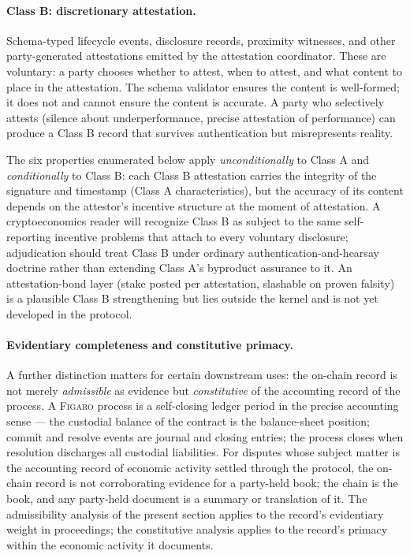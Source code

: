 \documentclass[11pt,a4paper]{article}
\theoremstyle{remark}
\newcommand{\figaro}{\textsc{Figaro}}
\begin{document}
\paragraph{Class B: discretionary attestation.}
Schema-typed lifecycle events, disclosure records, proximity
witnesses, and other party-generated attestations emitted by the
attestation coordinator. These are voluntary: a party chooses
whether to attest, when to attest, and what content to place in
the attestation. The schema validator ensures the content is
well-formed; it does not and cannot ensure the content is
accurate. A party who selectively attests (silence about
underperformance, precise attestation of performance) can produce
a Class B record that survives authentication but misrepresents
reality.

\medskip

The six properties enumerated below apply \emph{unconditionally}
to Class A and \emph{conditionally} to Class B: each Class B
attestation carries the integrity of the signature and timestamp
(Class A characteristics), but the accuracy of its content
depends on the attestor's incentive structure at the moment of
attestation. A cryptoeconomics reader will recognize Class B as
subject to the same self-reporting incentive problems that
attach to every voluntary disclosure; adjudication should treat
Class B under ordinary authentication-and-hearsay doctrine
rather than extending Class A's byproduct assurance to it. An
attestation-bond layer (stake posted per attestation, slashable
on proven falsity) is a plausible Class B strengthening but lies
outside the kernel and is not yet developed in the protocol.

\paragraph{Evidentiary completeness and constitutive primacy.}
A further distinction matters for certain downstream uses:
the on-chain record is not merely \emph{admissible} as
evidence but \emph{constitutive} of the accounting record of
the process. A \figaro{} process is a self-closing ledger period
in the precise accounting sense --- the custodial balance of the
contract is the balance-sheet position; commit and resolve
events are journal and closing entries; the process closes
when resolution discharges all custodial liabilities. For
disputes whose subject matter is the accounting record of
economic activity settled through the protocol, the on-chain
record is not corroborating evidence for a party-held book;
the chain is the book, and any party-held document is a
summary or translation of it. The admissibility analysis of
the present section applies to the record's evidentiary
weight in proceedings; the constitutive analysis applies to
the record's primacy within the economic activity it
documents.
\end{document}
